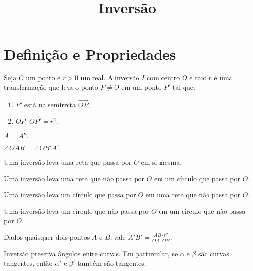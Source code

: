 \documentclass[final, 10pt, a4paper]{article}
\title{Inversão}
\author{}
\begin{document}
	
	\zeustitle

	\section{Definição e Propriedades}
	\begin{defn}[Inversão]
		Seja $O$ um ponto e $r > 0$ um real. A inversão $I$ com centro $O$ e raio $r$ é uma transformação que leva o ponto $P \neq O$ em um ponto $P'$ tal que:
		\begin{enumerate}[label = (\roman*)]
			\item $P'$ está na semirreta $\overrightarrow{OP}$;
			\item $OP \cdot OP' = r^2$.
		\end{enumerate}
	\end{defn}


	\begin{prop}
		$ A = A''.$
	\end{prop}

	\begin{prop}
		$ \angle OAB = \angle OB'A'. $
	\end{prop}

	\begin{prop}
		Uma inversão leva uma reta que passa por $O$ em si mesma.
	\end{prop}

	\begin{prop}
		Uma inversão leva uma reta que não passa por $O$ em um círculo que passa por $O$.
	\end{prop}

	\begin{prop}
		Uma inversão leva um círculo que passa por $O$ em uma reta que não passa por $O$.
	\end{prop}

	\begin{prop}
		Uma inversão leva um círculo que não passa por $O$ em um círculo que não passa por $O$.
	\end{prop}

	\begin{prop}
		Dados quaisquer dois pontos $A$ e $B$, vale $A'B' = \frac{AB \cdot r^2}{OA \cdot OB}$.
	\end{prop}

	\begin{prop}
		Inversão preserva ângulos entre curvas. Em partircular, se $\alpha$ e $\beta$ são curvas tangentes, então $\alpha'$ e $\beta'$ também são tangentes.
	\end{prop}
\end{document}
